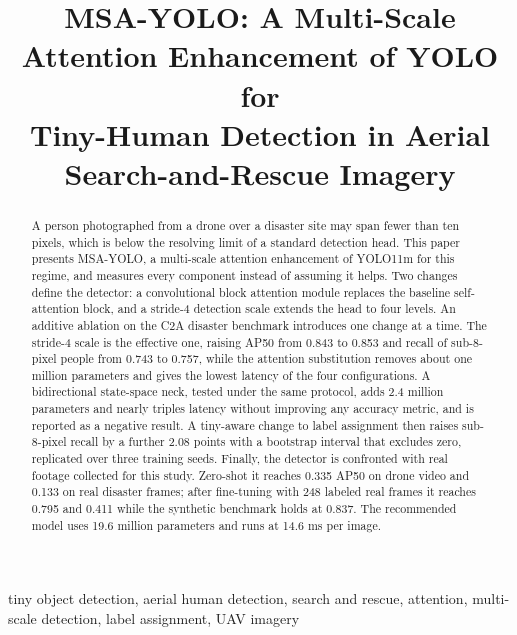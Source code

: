 \documentclass[conference,a4paper]{IEEEtran}
\begin{document}
\title{MSA-YOLO: A Multi-Scale Attention Enhancement of YOLO for\\
Tiny-Human Detection in Aerial Search-and-Rescue Imagery}

\author{
}

\maketitle

\begin{abstract}
A person photographed from a drone over a disaster site may span fewer than ten
pixels, which is below the resolving limit of a standard detection head. This
paper presents MSA-YOLO, a multi-scale attention enhancement of YOLO11m for this
regime, and measures every component instead of assuming it helps. Two changes
define the detector: a convolutional block attention module replaces the
baseline self-attention block, and a stride-4 detection scale extends the head to
four levels. An additive ablation on the C2A disaster benchmark introduces one
change at a time. The stride-4 scale is the effective one, raising AP50 from
0.843 to 0.853 and recall of sub-8-pixel people from 0.743 to 0.757, while the
attention substitution removes about one million parameters and gives the lowest
latency of the four configurations. A bidirectional state-space neck, tested
under the same protocol, adds 2.4 million parameters and nearly triples latency
without improving any accuracy metric, and is reported as a negative result. A
tiny-aware change to label assignment then raises sub-8-pixel recall by a further
2.08 points with a bootstrap interval that excludes zero, replicated over three
training seeds. Finally, the detector is confronted with real footage collected
for this study. Zero-shot it reaches 0.335 AP50 on drone video and 0.133 on real
disaster frames; after fine-tuning with 248 labeled real frames it reaches 0.795
and 0.411 while the synthetic benchmark holds at 0.837. The recommended model
uses 19.6 million parameters and runs at 14.6 ms per image.
\end{abstract}

\begin{IEEEkeywords}
tiny object detection, aerial human detection, search and rescue, attention,
multi-scale detection, label assignment, UAV imagery
\end{IEEEkeywords}
\end{document}
